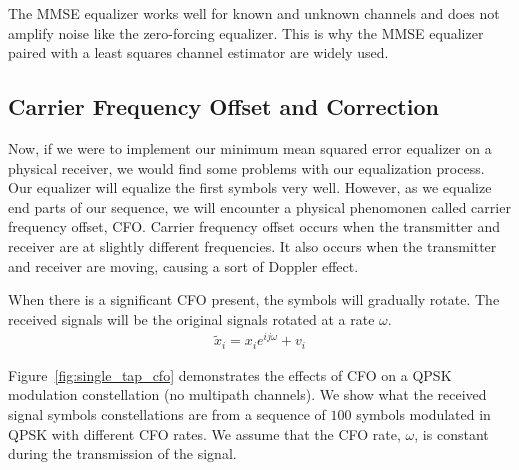 The MMSE equalizer works well for known and unknown channels and does not amplify noise like the zero-forcing equalizer.  This is why the MMSE equalizer paired with a least squares channel estimator are widely used.

 
\subsection{Carrier Frequency Offset and Correction}

Now, if we were to implement our minimum mean squared error equalizer on a physical receiver, we would find some problems with our equalization process.  
Our equalizer will equalize the first symbols very well.  However, as we equalize end parts of our sequence, we will encounter a physical phenomonen called carrier frequency offset, CFO.
Carrier frequency offset occurs when the transmitter and receiver are at slightly different frequencies.  It also occurs when the transmitter and receiver are moving, causing a sort of Doppler effect. 

When there is a significant CFO present, the symbols will gradually rotate. The received signals will be the original signals rotated at a rate $\omega$.
\begin{align}
\tilde{x}_i = x_i e^{ij\omega}+v_i
\end{align} 

Figure~\ref{fig:single_tap_cfo} demonstrates the effects of CFO on a QPSK modulation constellation (no multipath channels). 
We show what the received signal symbols constellations are from a sequence of $100$ symbols modulated in QPSK with different CFO rates.  We assume that the CFO rate, $\omega$, is constant during the transmission of the signal.

